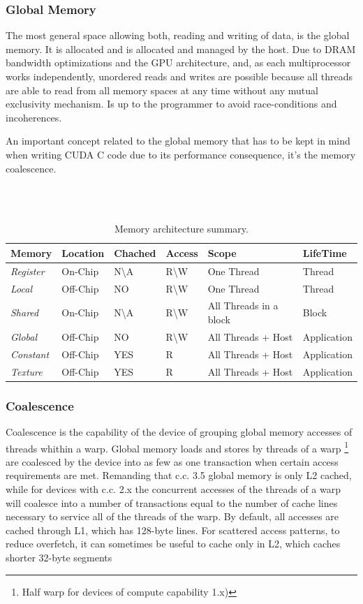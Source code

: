 \subsubsection{Global Memory}
The most general space allowing both, reading and writing of data, is
the global memory. It is allocated and is allocated and managed 
by the host. Due to DRAM bandwidth optimizations and the GPU architecture, and, 
as each multiprocessor works independently, unordered reads and writes are
possible because all threads are able to read from all memory spaces at any
time without any mutual exclusivity mechanism. Is up to the programmer to avoid
race-conditions and incoherences.

An important concept related to the global memory that has to be kept in mind
when writing CUDA C code due to its performance consequence, it's the
memory coalescence.

 \hfill \\ \hfill \\
 \begin{table}
\caption{Memory architecture summary.}
 \label{tab:memoryHierarchyScope}
\begin{tabular}[l]{|l|l|l|l|l|l|}
\hline 
\textbf{Memory} & \textbf{Location}&  \textbf{Chached}& \textbf{Access} &
\textbf{Scope} & \textbf{LifeTime}\\ \hline \hline

\textit{Register} & On-Chip	 & N\textbackslash A	& R\textbackslash W & One
Thread & Thread\\
\hline \textit{Local} & Off-Chip & NO	& R\textbackslash W & One Thread & 
Thread\\ \hline \textit{Shared} & On-Chip  & N\textbackslash A & R\textbackslash W & All
Threads in a block & Block\\
\hline \textit{Global} & Off-Chip & NO 	& R\textbackslash W & All Threads +
Host & Application	\\
\hline \textit{Constant} & Off-Chip & YES  & R & All Threads + Host & 
Application\\
\hline \textit{Texture} & Off-Chip & YES  & R & All Threads + Host &
Application \\
\hline
\end{tabular}
\end{table}
\subsubsection{Coalescence}
Coalescence is the capability of the device of grouping global memory accesses
of threads whithin a warp.
Global memory loads and stores by threads of a warp \footnote{Half warp for
devices of compute capability 1.x)} are coalesced by the device into as few as
one transaction when certain access requirements are met.
Remanding that c.c. 3.5 global memory is only L2 cached, while for devices with
c.c. 2.x the concurrent accesses of the threads of a warp will coalesce into a
number of transactions equal to the number of cache lines necessary to service
all of the threads of the warp. By default, all accesses are cached through L1,
which has 128-byte lines. For scattered access patterns, to reduce overfetch, it
can sometimes be useful to cache only in L2, which caches shorter 32-byte
segments

